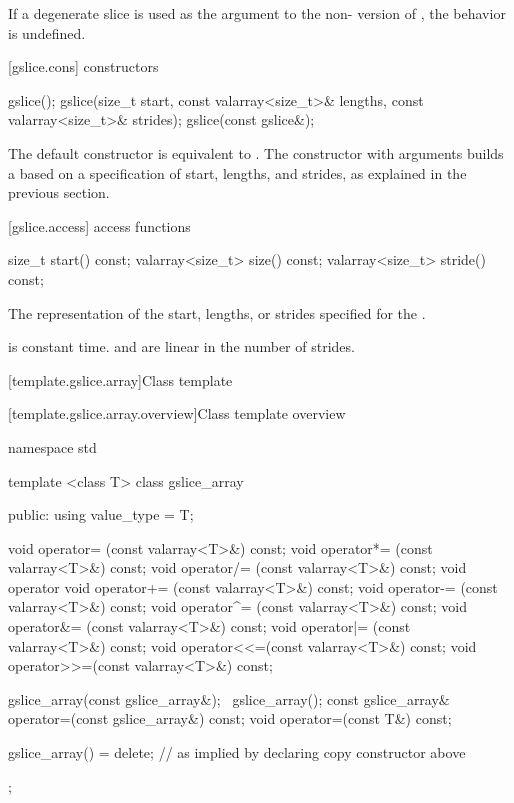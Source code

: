 \pnum
If a degenerate slice is used as the argument to the
non-
version of
,
the behavior is undefined.
%

[gslice.cons]{ constructors}

%
\begin{itemdecl}
gslice();
gslice(size_t start, const valarray<size_t>& lengths,
         const valarray<size_t>& strides);
gslice(const gslice&);
\end{itemdecl}

\begin{itemdescr}
\pnum
The default constructor is equivalent to
.
The constructor with arguments builds a
based on a specification of start, lengths, and strides, as explained
in the previous section.
\end{itemdescr}

[gslice.access]{ access functions}

%
%
%
\begin{itemdecl}
size_t           start()  const;
valarray<size_t> size() const;
valarray<size_t> stride() const;
\end{itemdecl}

\begin{itemdescr}
\pnum
\returns The representation of the
start, lengths, or strides specified for the .

\pnum
\complexity {} is constant time.  and 
are linear in the number of strides.
\end{itemdescr}

[template.gslice.array]{Class template }

[template.gslice.array.overview]{Class template  overview}

%
\begin{codeblock}
namespace std {
  template <class T> class gslice_array {
  public:
    using value_type = T;

    void operator=  (const valarray<T>&) const;
    void operator*= (const valarray<T>&) const;
    void operator/= (const valarray<T>&) const;
    void operator%
    void operator+= (const valarray<T>&) const;
    void operator-= (const valarray<T>&) const;
    void operator^= (const valarray<T>&) const;
    void operator&= (const valarray<T>&) const;
    void operator|= (const valarray<T>&) const;
    void operator<<=(const valarray<T>&) const;
    void operator>>=(const valarray<T>&) const;

    gslice_array(const gslice_array&);
    ~gslice_array();
    const gslice_array& operator=(const gslice_array&) const;
    void operator=(const T&) const;

    gslice_array() = delete;      // as implied by declaring copy constructor above
  };
}
\end{codeblock}

